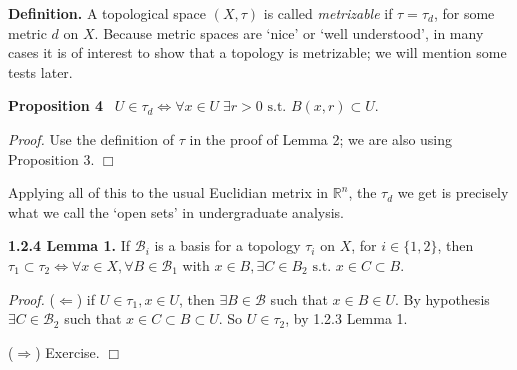 \documentclass[12pt]{article}
\newcommand{\st}[0]{ \textrm{ s.t. } }
\newcommand{\rimply}[0] { \Rightarrow }
\newcommand{\limply}[0] { \Leftarrow }
\newcommand{\lrimply}[0] { \Leftrightarrow }
\newcommand{\reals}[0] { \mathbb{R}}
\newcommand{\B}[0] { \mathcal{B} }
\begin{document}
\begin{flushleft} 
 { \bf Definition.}  A topological space $(X, \tau)$ is called \emph{metrizable}
 if $\tau = \tau_d$, for some metric $d$ on $X$. Because metric spaces are 
`nice' or `well understood', in many cases it is of interest to show that a 
topology is metrizable; we will mention some tests later. \end{flushleft}



\begin{flushleft} 
 { \bf Proposition 4 } \ $U \in \tau_d \lrimply \forall x \in U \; \exists r>0 \st B(x,r) \subset U$.
\end{flushleft}

\begin{flushleft} 
 \emph{Proof.  }Use the definition of $\tau$ in the proof of Lemma 2;
we are  also using Proposition 3. $\Box$ \end{flushleft}




\begin{flushleft} 
 Applying all of this to the usual Euclidian metrix in $\reals^n$, the $\tau_d$ 
we get is precisely what we call the `open sets' in undergraduate analysis.
\end{flushleft}


\begin{flushleft} 
 { \bf 1.2.4 Lemma  1. }  If $\B_i$ is a basis for a topology $\tau_i$ on $X$,
for 
 $i \in \{1,2\}$, then $\tau_1 \subset \tau_2 \lrimply \forall x \in X, \forall B \in \B_1$ with $x \in B, \exists C \in B_2 \st x \in C \subset B$. \\
\end{flushleft} 


\begin{flushleft}  
 \emph{Proof.  }($\limply$) if $U \in \tau_1, x \in U$, then $\exists B \in \B$ such that $x \in B \in U$. By hypothesis $\exists C \in \B_2$ such that
$x \in C \subset B \subset U$. So $U \in \tau_2$, by 1.2.3 
Lemma 1.

($\rimply$) Exercise.
 $\Box$
\end{flushleft}

\end{document}
